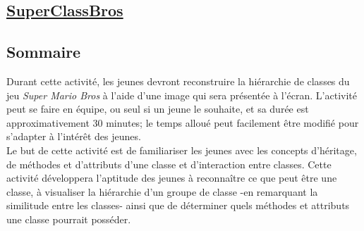 \documentclass[]{report}
\begin{document}
\begin{adjustwidth}{1.5cm}{0cm}

\newpage
\section*{\centering\underline{SuperClassBros}}

\subsection*{\Large{Sommaire}}
\vspace{-5mm}\makebox[0.917\textwidth]{\hrulefill}\vspace{3mm}

Durant cette activité, les jeunes devront reconstruire la hiérarchie de classes du jeu \textit{Super Mario Bros} à l'aide d'une image qui sera présentée à l'écran. L'activité peut se faire en équipe, ou seul si un jeune le souhaite, et sa durée est approximativement 30 minutes; le temps alloué peut facilement être modifié pour s'adapter à l'intérêt des jeunes. 
\\ 

Le but de cette activité est de familiariser les jeunes avec les concepts d'héritage, de méthodes et d'attributs d'une classe et d'interaction entre classes. Cette activité développera l'aptitude des jeunes à reconnaître ce que peut être une classe, à visualiser la hiérarchie d'un groupe de classe -en remarquant la similitude entre les classes- ainsi que de déterminer quels méthodes et attributs une classe pourrait posséder.

\vspace{1cm}


\end{adjustwidth}
\end{document}
